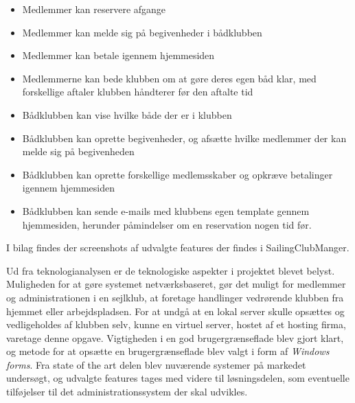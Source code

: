 \begin{itemize}
	\item Medlemmer kan reservere afgange
	\item Medlemmer kan melde sig på begivenheder i bådklubben
	\item Medlemmer kan betale igennem hjemmesiden
	\item Medlemmerne kan bede klubben om at gøre deres egen båd klar, med forskellige aftaler klubben håndterer
        før den aftalte tid
	\item Bådklubben kan vise hvilke både der er i klubben
	\item Bådklubben kan oprette begivenheder, og afsætte hvilke medlemmer der kan melde sig på begivenheden
	\item Bådklubben kan oprette forskellige medlemsskaber og opkræve betalinger igennem hjemmesiden
	\item Bådklubben kan sende e-mails med klubbens egen template gennem hjemmesiden, herunder påmindelser om en
        reservation nogen tid før.
\end{itemize}

I bilag  findes der screenshots af udvalgte features der findes i SailingClubManger.


Ud fra teknologianalysen er de teknologiske aspekter i projektet blevet belyst. Muligheden for at gøre systemet
netværksbaseret, gør det muligt for medlemmer og administrationen i en sejlklub, at foretage handlinger vedrørende
klubben fra hjemmet eller arbejdspladsen. For at undgå at en lokal server skulle opsættes og vedligeholdes af klubben
selv, kunne en virtuel server, hostet af et hosting firma, varetage denne opgave. Vigtigheden i en god brugergrænseflade
blev gjort klart, og metode for at opsætte en brugergrænseflade blev valgt i form af \textit{Windows forms}. Fra state
of the art delen blev nuværende systemer på markedet undersøgt, og udvalgte features tages med videre til løsningsdelen,
som eventuelle tilføjelser til det administrationssystem der skal udvikles.


